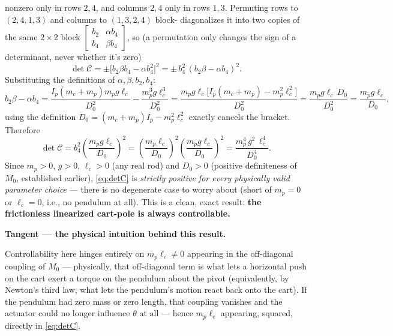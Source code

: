 \documentclass[11pt]{article}
\newenvironment{tangent}[1]{%
  \par\smallskip\noindent\hrulefill\par
  \noindent\textbf{Tangent — #1.}\par\smallskip
  \begingroup\itshape
}{%
  \endgroup
  \par\noindent\hrulefill\par\smallskip
}
\begin{document}
nonzero only in rows $2,4$, and columns $2,4$ only in rows $1,3$.
Permuting rows to $(2,4,1,3)$ and columns to $(1,3,2,4)$ block-
diagonalizes it into two copies of the same $2\times2$ block
$\begin{bmatrix} b_2 & \alpha b_4\\ b_4 & \beta b_4\end{bmatrix}$, so
(a permutation only changes the sign of a determinant, never whether it's
zero)
\[
  \det\mathcal C = \pm\big[b_2\beta b_4 - \alpha b_4^2\big]^2
  = \pm\, b_4^2\,(b_2\beta - \alpha b_4)^2.
\]
Substituting the definitions of $\alpha,\beta,b_2,b_4$:
\[
  b_2\beta - \alpha b_4 =
  \frac{I_p(m_c+m_p)m_p g\ell_c}{D_0^2} - \frac{m_p^3 g\ell_c^3}{D_0^2}
  = \frac{m_p g\ell_c\big[I_p(m_c+m_p) - m_p^2\ell_c^2\big]}{D_0^2}
  = \frac{m_p g\ell_c\, D_0}{D_0^2} = \frac{m_p g\ell_c}{D_0},
\]
using the definition $D_0=(m_c+m_p)I_p-m_p^2\ell_c^2$ exactly cancels the
bracket. Therefore
\begin{equation}
  \det\mathcal C = b_4^2\left(\frac{m_p g\ell_c}{D_0}\right)^2
  = \left(\frac{m_p\ell_c}{D_0}\right)^2
  \left(\frac{m_p g\ell_c}{D_0}\right)^2
  = \frac{m_p^4\,g^2\,\ell_c^4}{D_0^4}. \label{eq:detC}
\end{equation}
Since $m_p>0$, $g>0$, $\ell_c>0$ (any real rod) and $D_0>0$ (positive
definiteness of $M_0$, established earlier), \eqref{eq:detC} is
\emph{strictly positive for every physically valid parameter choice} —
there is no degenerate case to worry about (short of $m_p=0$ or $\ell_c=0$,
i.e., no pendulum at all). This is a clean, exact result: \textbf{the
frictionless linearized cart-pole is always controllable.}

\begin{tangent}{the physical intuition behind this result}
Controllability here hinges entirely on $m_p\ell_c\ne0$ appearing in the
off-diagonal coupling of $M_0$ — physically, that off-diagonal term is
what lets a horizontal push on the cart exert a torque on the pendulum
about the pivot (equivalently, by Newton's third law, what lets the
pendulum's motion react back onto the cart). If the pendulum had zero mass
or zero length, that coupling vanishes and the actuator could no longer
influence $\theta$ at all — hence $m_p\ell_c$ appearing, squared, directly
in \eqref{eq:detC}.
\end{tangent}
\end{document}
